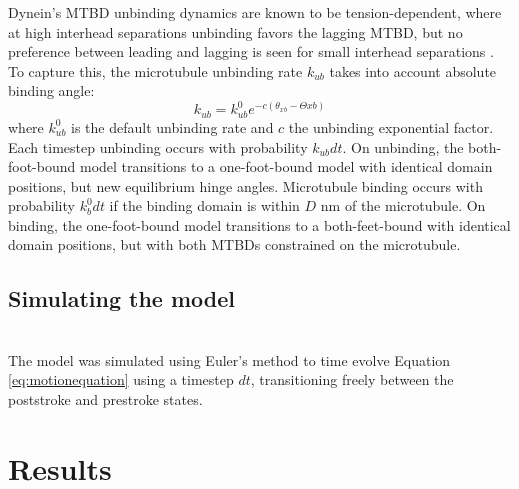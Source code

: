 \documentclass[9pt,twocolumn,twoside]{pnas-new}
\begin{document}
Dynein's MTBD unbinding dynamics are known to be tension-dependent, where at high interhead separations unbinding favors the lagging MTBD, but no preference between leading and lagging is seen for small interhead separations \cite{yildizpaper}. To capture this, the microtubule unbinding rate $k_{ub}$ takes into account absolute binding angle:
%
\begin{equation}
  k_{ub} = k_{ub}^0e^{-c\left(\theta_{xb}-\Theta{xb}\right)}
\end{equation}
%
where $k_{ub}^0$ is the default unbinding rate and $c$ the unbinding exponential factor. Each timestep unbinding occurs with probability $k_{ub}dt$. On unbinding, the both-foot-bound model transitions to a one-foot-bound model with identical domain positions, but new equilibrium hinge angles. Microtubule binding occurs with probability $k_{b}^0dt$ if the binding domain is within $D$ nm of the microtubule. On binding, the one-foot-bound model transitions to a both-feet-bound with identical domain positions, but with both MTBDs constrained on the microtubule.\\

\subsection*{Simulating the model}~\\
The model was simulated using Euler's method to time evolve Equation \ref{eq:motionequation} using a timestep $dt$, transitioning freely between the poststroke and prestroke states.

\section{Results}

\end{document}

